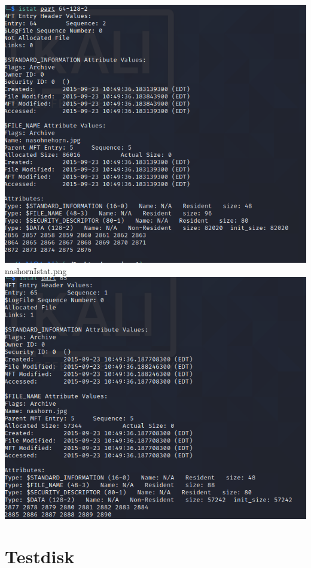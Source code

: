 \includegraphics[scale=0.6]{bilder/nasohnehorn_istat.png } \\
nashornIstat.png\\
\includegraphics[scale=0.6]{bilder/nashorn_istat.png }\\

\section{Testdisk}

